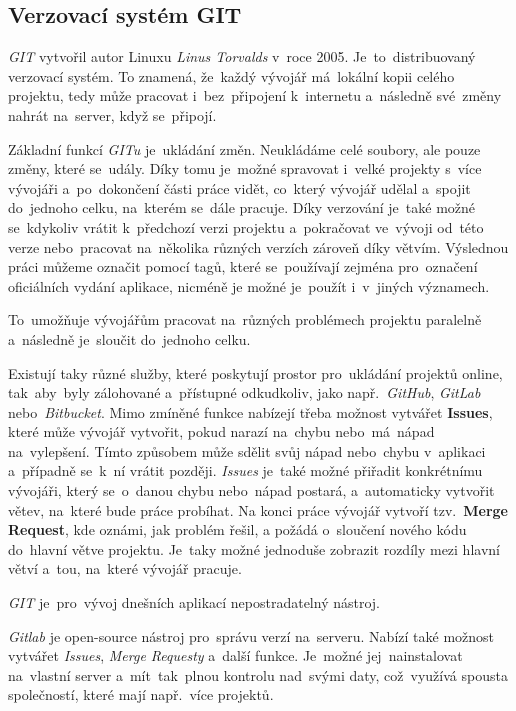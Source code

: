 \documentclass[10pt,a4paper]{article}
\begin{document}
        \subsection{Verzovací systém GIT}
        \emph{GIT} vytvořil autor Linuxu \emph{Linus Torvalds} v~roce 2005. Je~to~distribuovaný verzovací systém. To znamená, že~každý vývojář má~lokální kopii celého projektu, tedy může pracovat i~bez~připojení k~internetu a~následně své~změny nahrát na~server, když se~připojí.
        
        Základní funkcí \emph{GITu} je~ukládání změn. Neukládáme celé soubory, ale pouze změny, které se~udály. Díky tomu je~možné spravovat i~velké projekty s~více vývojáři a~po~dokončení části práce vidět, co~který vývojář udělal a~spojit do~jednoho celku, na~kterém se~dále pracuje. Díky verzování je~také možné se~kdykoliv vrátit k~předchozí verzi projektu a~pokračovat ve~vývoji od~této verze nebo~pracovat na~několika různých verzích zároveň díky větvím. Výslednou práci můžeme označit pomocí tagů, které se~používají zejména pro~označení oficiálních vydání aplikace, nicméně je možné je~použít i~v~jiných významech.
        
        To~umožňuje vývojářům pracovat na~různých problémech projektu paralelně a~následně je~sloučit do~jednoho celku.

        Existují taky různé služby, které poskytují prostor pro~ukládání projektů online, tak~aby~byly zálohované a~přístupné odkudkoliv, jako např.~\emph{GitHub}, \emph{GitLab} nebo~\emph{Bitbucket}. Mimo zmíněné funkce nabízejí třeba možnost vytvářet \textbf{Issues}, které může vývojář vytvořit, pokud narazí na~chybu nebo~má~nápad na~vylepšení. Tímto způsobem může sdělit svůj nápad nebo~chybu v~aplikaci a~případně se~k~ní vrátit později. \emph{Issues} je~také možné přiřadit konkrétnímu vývojáři, který se~o~danou chybu nebo~nápad postará, a~automaticky vytvořit větev, na~které bude práce probíhat. Na konci práce vývojář vytvoří tzv.~\textbf{Merge Request}, kde oznámi, jak problém řešil, a požádá o~sloučení nového kódu do~hlavní větve projektu. Je~taky možné jednoduše zobrazit rozdíly mezi hlavní větví a~tou, na~které vývojář pracuje.
        
        \emph{GIT} je~pro~vývoj dnešních aplikací nepostradatelný nástroj. \cite{gitscmBook}
        
        \emph{Gitlab} je open-source nástroj pro~správu verzí na~serveru. Nabízí také možnost vytvářet \emph{Issues}, \emph{Merge Requesty} a~další funkce. Je~možné jej~nainstalovat na~vlastní server a~mít~tak~plnou kontrolu nad~svými daty, což~využívá spousta společností, které mají např.~více projektů.
\end{document}
